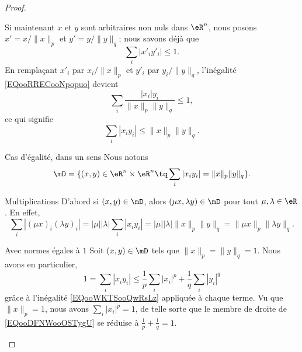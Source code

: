 \begin{proof}
\begin{subproof}
            Si maintenant \( x\) et \( y\) sont arbitraires non nuls dans \( \eR^n\), nous posons \( x'=x/\| x \|_p\) et \( y'=y/\| y \|_q\); nous savons déjà que
            \begin{equation}        \label{EQooRRECooNpopuo}
                \sum_i| x'_iy'_i |\leq 1.
            \end{equation}
            En remplaçant \( x'_i\) par \( x_i/\| x \|_p\) et \( y'_i\) par \( y_i/\| y \|_q\), l'inégalité \eqref{EQooRRECooNpopuo} devient
            \begin{equation}
                \sum_i\frac{ | x_i |y_i }{ \| x \|_p\| y \|_q  }\leq 1,
            \end{equation}
            ce qui signifie
            \begin{equation}
                \sum_i| x_iy_i |\leq \| x \|_p\| y \|_q.
            \end{equation}
        \item[Cas d'égalité, dans un sens]
            Nous notons
            \begin{equation}
                \mD=\{ (x,y)\in \eR^n\times \eR^n\tq \sum_i| x_iy_i |=\| x \|_p\| y \|_q \}.
            \end{equation}
            \begin{subproof}
            \item[Multiplications]
            D'abord si \( (x,y)\in\mD\), alors \( (\mu x, \lambda y)\in \mD\) pour tout \( \mu,\lambda\in \eR\). En effet,
            \begin{equation}
                \sum_i| (\mu x)_i(\lambda y)_i |=| \mu | |\lambda |\sum_i| x_iy_i |=| \mu | |\lambda |\| x \|_p\| y \|_q=\|\mu x \|_p\| \lambda y \|_q.
            \end{equation}
        \item[Avec normes égales à \( 1\)]
                Soit \( (x,y)\in \mD\) tels que \( \| x \|_p=\| y \|_q=1\). Nous avons en particulier,
                \begin{equation}    \label{EQooDFNWooOSTygU}
                    1=\sum_i| x_iy_i |\leq \frac{1}{ p }\sum_i| x_i |^p+\frac{1}{ q }\sum_i| y_i |^q
                \end{equation}
                grâce à l'inégalité \eqref{EQooWKTSooQwRsLz} appliquée à chaque terme. Vu que \( \| x \|_p=1\), nous avons \( \sum_i| x_i |^p=1\), de telle sorte que le membre de droite de \eqref{EQooDFNWooOSTygU} se réduise à \( \frac{1}{ p }+\frac{1}{ q }=1\).


\end{subproof}
\end{subproof}
\end{proof}
